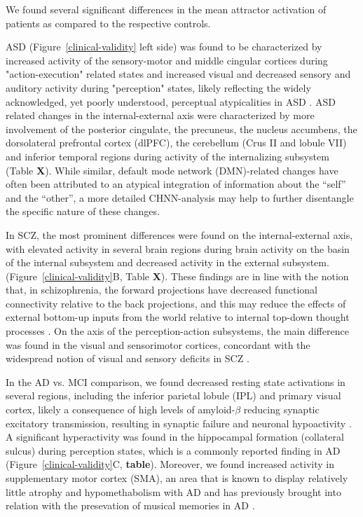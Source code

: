 \documentclass{article}
\begin{document}
We found several significant differences in the mean attractor activation of patients as compared to the respective
controls.

ASD (Figure~\ref{clinical-validity} left side) was found to be characterized by increased activity of the sensory-motor and middle cingular cortices during "action-execution" related states and increased visual and decreased sensory and auditory activity during "perception" states, likely reflecting the widely acknowledged, yet poorly understood, perceptual atypicalities in ASD \citep{hadad2019perception}.
ASD related changes in the internal-external axis were characterized by more involvement of the posterior cingulate, the precuneus, the nucleus accumbens, the dorsolateral prefrontal cortex (dlPFC), the cerebellum (Crus II and lobule VII) and inferior temporal regions during activity of the internalizing subsystem (Table \textbf{X}). While similar, default mode network (DMN)-related changes have often been attributed to an atypical integration of information about the ``self'' and the ``other'', a more detailed CHNN-analysis may help to further disentangle the specific nature of these changes.

In SCZ, the most prominent differences were found on the internal-external axis, with elevated activity in several brain regions during brain activity on the basin of the internal subsystem and decreased activity in the external subsystem. (Figure~\ref{clinical-validity}B, Table \textbf{X}). These findings are in line with the notion that, in schizophrenia, the forward projections have decreased functional connectivity relative to the back projections, and this may reduce the effects of external bottom-up inputs from the world relative to internal top-down thought processes \citep{rolls2021attractor}.
On the axis of the perception-action subsystems, the main difference was found in the visual and sensorimotor cortices, concordant with the widespread notion of visual and sensory deficits in SCZ \citep{javitt2009sensory, butler2008visual, adamek2022early}.

In the AD vs. MCI comparison, we found decreased resting state activations in several regions, including the inferior parietal lobule (IPL) and primary visual cortex, likely a consequence of high levels of amyloid-$\beta$ reducing synaptic excitatory transmission, resulting in synaptic failure and neuronal hypoactivity \citep{selkoe2002alzheimer}. A significant hyperactivity was found in the hippocampal formation (collateral sulcus) during perception states, which is
a commonly reported finding in AD \citep{aizenstein2015hippocampal, ewers2011neuroimaging}
(Figure~\ref{clinical-validity}C, \textbf{table}). Moreover, we found increased activity in supplementary motor cortex (SMA), an area that is known to display relatively little atrophy and hypomethabolism with AD and has previously brought into relation with the presevation of musical memories in AD \citep{jacobsen2015musical}.
\end{document}

